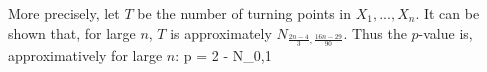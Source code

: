 More precisely, let $T$ be the number of turning points in
$X_1, ..., X_n$. It can be shown
\cite{brockwell2002introduction,weber-ts} that, for large $n$,
$T$ is approximately $N_{\frac{2n-4}{3}, \frac{16n-29}{90}}$.
Thus the $p$-value is, approximatively for large $n$:
 \be
 p = 2  - N_{0,1}\lp
   \rp \rp
 \ee
%

